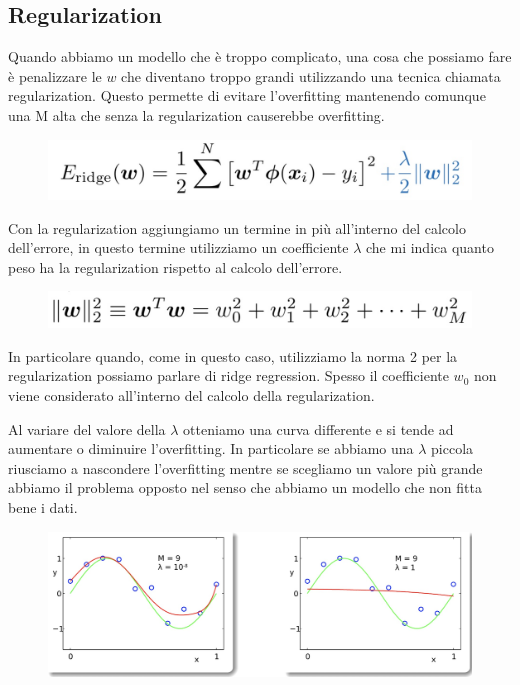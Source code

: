 \documentclass[14pt]{extreport}
\begin{document}
\subsection{Regularization}

Quando abbiamo un modello che è troppo complicato, una cosa che possiamo fare è penalizzare le $w$ che diventano troppo grandi utilizzando una tecnica
chiamata regularization. Questo permette di evitare l'overfitting mantenendo comunque una M alta che senza la regularization causerebbe overfitting.

\begin{figure}[H]
	\centering
	\includegraphics[width=0.7\linewidth]{87.jpeg}
\end{figure}

Con la regularization aggiungiamo un termine in più all'interno del calcolo dell'errore, in questo termine utilizziamo un coefficiente $\lambda$ che
mi indica quanto peso ha la regularization rispetto al calcolo dell'errore.

\begin{figure}[H]
	\centering
	\includegraphics[width=0.7\linewidth]{88.jpeg}
\end{figure}

In particolare quando, come in questo caso, utilizziamo la norma 2 per la regularization possiamo parlare di ridge regression. Spesso il coefficiente
$w_0$ non viene considerato all'interno del calcolo della regularization.

Al variare del valore della $\lambda$ otteniamo una curva differente e si tende ad aumentare o diminuire l'overfitting. In particolare se abbiamo una
$\lambda$ piccola riusciamo a nascondere l'overfitting mentre se scegliamo un valore più grande abbiamo il problema opposto nel senso che abbiamo un
modello che non fitta bene i dati.

\begin{figure}[H]
	\centering
	\includegraphics[width=0.6\linewidth]{89.jpeg}
\end{figure}
\end{document}
